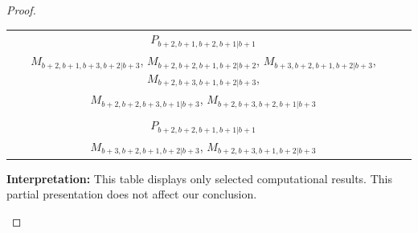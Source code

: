 \begin{proof}
\begin{enumerate}
\begin{enumerate}
\begin{enumerate}
\begin{table}[htbp]
\begin{tabular}{cc}
 $P_{b+2,b+1,b+2,b+1|b+1}$ & \makecell{
 $M_{b+2,b+2,b+2,b+1|b+2}$,
 $M_{b+2,b+1,b+2,b+2|b+2}$,
 $M_{b+3,b+2,b+2,b+1|b+3}$,
 $M_{b+3,b+1,b+2,b+2|b+3}$, \\
 $M_{b+2,b+1,b+3,b+2|b+3}$,
 $M_{b+2,b+2,b+1,b+2|b+2}$,
 $M_{b+3,b+2,b+1,b+2|b+3}$,
 $M_{b+2,b+3,b+1,b+2|b+3}$, \\
 $M_{b+2,b+2,b+3,b+1|b+3}$,
 $M_{b+2,b+3,b+2,b+1|b+3}$
}\\
 & \\
 $P_{b+2,b+2,b+1,b+1|b+1}$ & \makecell{
 $M_{b+2,b+2,b+2,b+1|b+2}$,
 $M_{b+2,b+2,b+1,b+2|b+2}$,
 $M_{b+3,b+2,b+2,b+1|b+3}$,
 $M_{b+2,b+3,b+2,b+1|b+3}$, \\
 $M_{b+3,b+2,b+1,b+2|b+3}$,
 $M_{b+2,b+3,b+1,b+2|b+3}$
}\\
\bottomrule
\end{tabular}
\vspace{0.5em}
\parbox{\linewidth}{\small
\textbf{Interpretation:}
This table displays only selected computational results. This partial presentation does not affect our conclusion.
}
\end{table}



\end{enumerate}
\end{enumerate}
\end{enumerate}
\end{proof}
